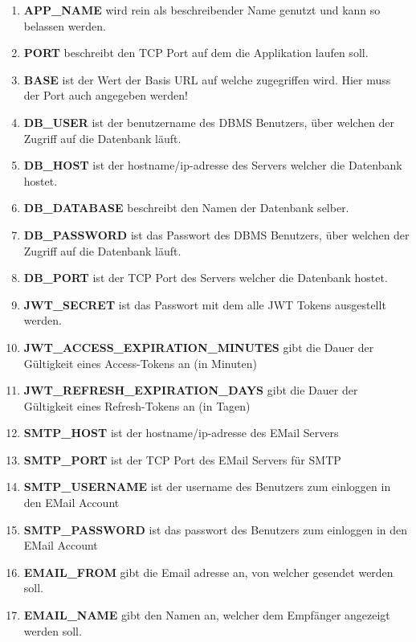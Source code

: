 	\begin{enumerate}
		\item \textbf{APP\_NAME} wird rein als beschreibender Name genutzt und kann so belassen werden.
		\item \textbf{PORT} beschreibt den TCP Port auf dem die Applikation laufen soll.
		\item \textbf{BASE} ist der Wert der Basis URL auf welche zugegriffen wird. Hier muss der Port auch angegeben werden!
		\item \textbf{DB\_USER} ist der benutzername des DBMS Benutzers, über welchen der Zugriff auf die Datenbank läuft.
		\item \textbf{DB\_HOST} ist der hostname/ip-adresse des Servers welcher die Datenbank hostet.
		\item \textbf{DB\_DATABASE} beschreibt den Namen der Datenbank selber.
		\item \textbf{DB\_PASSWORD} ist das Passwort des DBMS Benutzers, über welchen der Zugriff auf die Datenbank läuft.
		\item \textbf{DB\_PORT} ist der TCP Port des Servers welcher die Datenbank hostet.
		\item \textbf{JWT\_SECRET} ist das Passwort mit dem alle JWT Tokens ausgestellt werden.
		\item \textbf{JWT\_ACCESS\_EXPIRATION\_MINUTES} gibt die Dauer der Gültigkeit eines Access-Tokens an (in Minuten)
		\item \textbf{JWT\_REFRESH\_EXPIRATION\_DAYS} gibt die Dauer der Gültigkeit eines Refresh-Tokens an (in Tagen)
		\item \textbf{SMTP\_HOST} ist der hostname/ip-adresse des EMail Servers
		\item \textbf{SMTP\_PORT} ist der TCP Port des EMail Servers für SMTP
		\item \textbf{SMTP\_USERNAME} ist der username des Benutzers zum einloggen in den EMail Account
		\item \textbf{SMTP\_PASSWORD} ist das passwort des Benutzers zum einloggen in den EMail Account
		\item \textbf{EMAIL\_FROM} gibt die Email adresse an, von welcher gesendet werden soll.
		\item \textbf{EMAIL\_NAME} gibt den Namen an, welcher dem Empfänger angezeigt werden soll.
	\end{enumerate}